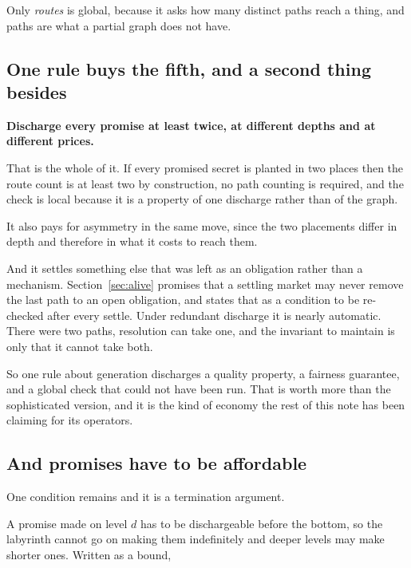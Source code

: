 \documentclass[11pt,a4paper]{article}
\begin{document}
Only \emph{routes} is global, because it asks how many distinct paths reach a thing, and paths are
what a partial graph does not have.

\subsection{One rule buys the fifth, and a second thing besides}

\begin{sectionbox}
\textbf{Discharge every promise at least twice, at different depths and at different prices.}
\end{sectionbox}

That is the whole of it. If every promised secret is planted in two places then the route count is
at least two by construction, no path counting is required, and the check is local because it is a
property of one discharge rather than of the graph.

It also pays for asymmetry in the same move, since the two placements differ in depth and therefore
in what it costs to reach them.

And it settles something else that was left as an obligation rather than a mechanism.
Section~\ref{sec:alive} promises that a settling market may never remove the last path to an open
obligation, and states that as a condition to be re-checked after every settle. Under redundant
discharge it is nearly automatic. There were two paths, resolution can take one, and the invariant
to maintain is only that it cannot take both.

\begin{sectionbox}
So one rule about generation discharges a quality property, a fairness guarantee, and a global
check that could not have been run. That is worth more than the sophisticated version, and it is
the kind of economy the rest of this note has been claiming for its operators.
\end{sectionbox}

\subsection{And promises have to be affordable}

One condition remains and it is a termination argument.

A promise made on level $d$ has to be dischargeable before the bottom, so the labyrinth cannot go
on making them indefinitely and deeper levels may make shorter ones. Written as a bound,
\end{document}
